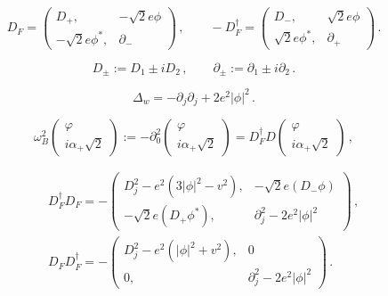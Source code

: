 \documentclass[]{article}
\begin{document}
\begin{equation}
	D_F = \left( \begin{array}{cc} D_+,& -\sqrt{2} e\phi \\
		-\sqrt{2}e\phi^*,&\partial_-
	\end{array}\right)\,,\qquad
	-D_F^\dag = \left( \begin{array}{cc} D_-,& \sqrt{2} e\phi \\
		\sqrt{2}e\phi^*,&\partial_+
	\end{array}\right)\,.\label{DFDF}
\end{equation}

\begin{equation}
	D_\pm := D_1\pm i D_2\,,\qquad 
	\partial_\pm :=\partial_1\pm i \partial_2 \,.\label{Ddpm}
\end{equation}

\begin{equation}
	\Delta_w=-\partial_j\partial_j +2e^2|\phi |^2 \,.\label{opwa0}
\end{equation}

\begin{equation}
	\omega_B^2 
	\left( \begin{array}{c} \varphi \\ {i\alpha_+}{\sqrt{2}} \end{array} \right)
	:= -\partial_0^2
	\left( \begin{array}{c} \varphi \\ {i\alpha_+}{\sqrt{2}} \end{array} \right)
	= D_F^\dag D 
	\left( \begin{array}{c} \varphi \\ {i\alpha_+}{\sqrt{2}} \end{array} \right)\,,
	\label{omB}
\end{equation}

\begin{eqnarray}
	&&D_F^\dag D_F = -\left( \begin{array}{cc} D_j^2 - e^2 (3|\phi |^2
		-v^2 ), &  -\sqrt{2} e (D_-\phi ) \\
		-\sqrt{2} e (D_+\phi^*), & \partial_j^2 -2e^2 |\phi |^2
	\end{array} \right) \label{DdagD}\,,\\
	&&D_F D_F^\dag = -\left( \begin{array}{cc}D_j^2 - e^2 (|\phi |^2
		+v^2 ), & 0 \\ 0, & \partial_j^2 -2e^2 |\phi |^2
	\end{array} \right)\,.\label{DDdag}
\end{eqnarray}
\end{document}
